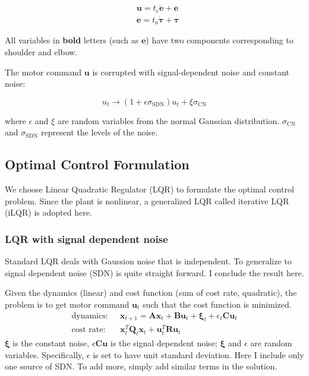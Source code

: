 \begin{equation}
\begin{split}
& \bm{u} = t_e \dot{\bm{e}} + \bm{e} \\
& \bm{e} = t_a \dot{\bm{\tau}} + \bm{\tau}
\end{split}
\end{equation}

All variables in \textbf{bold} letters (such as $\bm{e}$) have two components corresponding to shoulder and elbow.

The motor command $\bm{u}$ is corrupted with signal-dependent noise and constant noise:

\begin{equation}
u_t \rightarrow (1 + \epsilon\sigma_{\text{SDN}}) u_t + \xi\sigma_{\text{CN}}
\end{equation}

where $\epsilon$ and $\xi$ are random variables from the normal Gaussian distribution.
$\sigma_{\text{CN}}$ and $\sigma_{\text{SDN}}$ represent the levels of the noise.

\subsection{Optimal Control Formulation}
\label{ocformulation}

We choose Linear Quadratic Regulator (LQR) \cite{todorov2006optimal} to formulate the optimal control problem. Since the plant is nonlinear, a generalized LQR called iterative LQR (iLQR) is adopted here.

\subsubsection{LQR with signal dependent noise}
Standard LQR deals with Gaussion noise that is independent. To generalize to signal dependent noise (SDN) is quite straight forward. I conclude the result here.

Given the dynamics (linear) and cost function (sum of cost rate, quadratic), the problem is to get motor command $\bm{u}_t$ such that the cost function is minimized.
\begin{equation}\label{optimprob}
\begin{split}
\text{dynamics:~~} & \bm{x}_{t+1} = \bm{Ax}_t + \bm{Bu}_t + \bm{\xi}_t + \epsilon_t\bm{Cu}_t \\
\text{cost rate:~~} & \bm{x}_t^T\bm{Q}_t\bm{x}_t + \bm{u}_t^T\bm{Ru}_t
\end{split}
\end{equation}
$\bm{\xi}$ is the constant noise, $\epsilon\bm{Cu}$ is the signal dependent noise; $\bm{\xi}$ and $\epsilon$ are random variables. Specifically, $\epsilon$ is set to have unit standard deviation. Here I include only one source of SDN. To add more, simply add similar terms in the solution.

